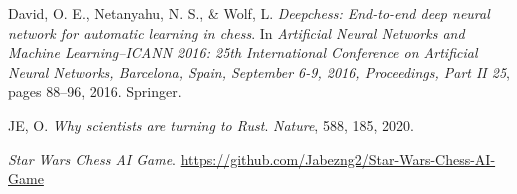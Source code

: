 

\begin{thebibliography}{}


David, O. E., Netanyahu, N. S., \& Wolf, L.
\textit{Deepchess: End-to-end deep neural network for automatic learning in chess}.
In \textit{Artificial Neural Networks and Machine Learning--ICANN 2016: 25th International Conference on Artificial Neural Networks, Barcelona, Spain, September 6-9, 2016, Proceedings, Part II 25}, pages 88--96, 2016.
Springer.

JE, O.
\textit{Why scientists are turning to Rust}.
\textit{Nature}, 588, 185, 2020.

\textit{Star Wars Chess AI Game}.
\url{https://github.com/Jabezng2/Star-Wars-Chess-AI-Game}

\end{thebibliography}
